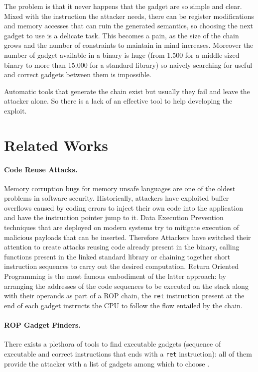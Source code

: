 \documentclass[twocolumn, 11pt]{article}
\begin{document}
\bigskip
The problem is that it never happens that the gadget are so simple and clear. Mixed with the instruction the attacker needs, there can be register modifications and memory accesses that can ruin the generated semantics, so choosing the next gadget to use is a delicate task. This becomes a pain, as the size of the chain grows and the number of constraints to maintain in mind increases.
Moreover the number of gadget available in a binary is huge (from 1.500 for a middle sized binary to more than 15.000 for a standard library) so naively searching for useful and correct gadgets between them is impossible.

 Automatic tools that generate the chain exist but usually they fail and leave the attacker alone. So there is a lack of an effective tool to help developing the exploit.

\section{Related Works}
\label{se:related}
\paragraph{Code Reuse Attacks.}
Memory corruption bugs for memory unsafe languages are one of the oldest problems in software security. Historically, attackers have exploited buffer overflows caused by coding errors to inject their own code into the application and have the instruction pointer jump to it. Data Execution Prevention techniques that are deployed on modern systems try to mitigate execution of malicious payloads that can be inserted. Therefore Attackers have switched their attention to create attacks reusing code already present in the binary, calling functions present in the linked standard library or chaining together short instruction sequences to carry out the desired computation. Return Oriented Programming is the most famous embodiment of the latter approach: by arranging the addresses of the code sequences to be executed on the stack along with their operands as part of a ROP chain, the {\tt ret} instruction present at the end of each gadget instructs the CPU to follow the flow entailed by the chain.

\paragraph{ROP Gadget Finders.} There exists a plethora of tools to find executable gadgets (sequence of executable and correct instructions that ends with a {\tt ret} instruction): all of them provide the attacker with a list of gadgets among which to choose \cite{ropper} \cite{ROPGadget}.
\end{document}
